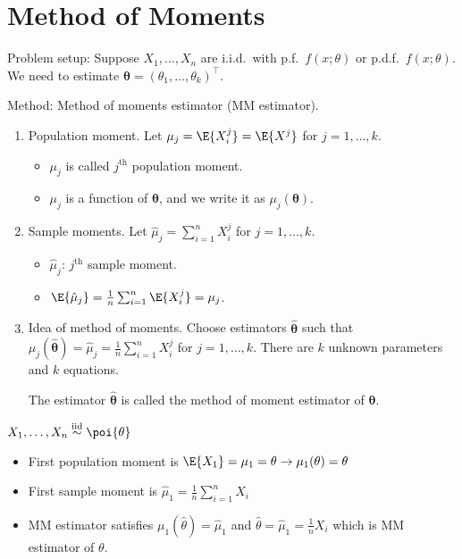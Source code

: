 \section{Method of Moments}
Problem setup: Suppose $ X_1,\ldots,X_n $
are i.i.d.\ with p.f.\ $ f(x;\theta) $
or p.d.f.\ $ f(x;\theta) $. We need to estimate
$ \symbf{\theta}=(\theta_1,\ldots,\theta_k)^\top $.

Method: Method of moments estimator (MM estimator).
\begin{enumerate}
    \item Population moment. Let $ \mu_j=\E{X_i^j}=\E{X^j} $
          for $ j=1,\ldots,k $.
          \begin{itemize}
              \item $ \mu_j $ is called $ j^{\text{th}} $ population moment.
              \item $ \mu_j $ is a function of $ \symbf{\theta} $,
                    and we write it as $ \mu_j(\symbf{\theta}) $.
          \end{itemize}
    \item Sample moments. Let $ \hat{\mu}_j=\sum_{i=1}^{n} X_i^j $ for
          $ j=1,\ldots,k $.
          \begin{itemize}
              \item $ \hat{\mu}_j $: $ j^{\text{th}} $ sample moment.
              \item $ \E{\hat{\mu}_j}=\frac{1}{n} \sum_{i=1}^{n}\E{X_i^j}=\mu_j $.
          \end{itemize}
    \item Idea of method of moments.
          Choose estimators $ \hat{\symbf{\theta}} $
          such that $ \mu_j(\hat{\symbf{\theta}})=
              \hat{\mu}_j=\frac{1}{n} \sum_{i=1}^{n} X_i^j $
          for
          $ j=1,\ldots,k $. There are $ k $ unknown parameters
          and $ k $ equations.

          The estimator $ \hat{\symbf{\theta}} $ is called the method
          of moment estimator of $ \symbf{\theta} $.
\end{enumerate}

\begin{Example}{}{}
    $ X_1,\ldots,X_n\stackrel{\text{iid}}{\sim}\poi{\theta} $
    \begin{itemize}
        \item First population moment is $ \E{X_1}=\mu_1=\theta\to
                  \mu_1(\theta)=\theta $
        \item First sample moment is $ \hat{\mu}_1=\frac{1}{n} \sum_{i=1}^{n} X_i $
        \item MM estimator satisfies $ \mu_1(\hat{\theta})=\hat{\mu}_1 $
              and $ \hat{\theta}=\hat{\mu}_1=\frac{1}{n}X_i $
              which is MM estimator of $ \theta $.
    \end{itemize}
\end{Example}
